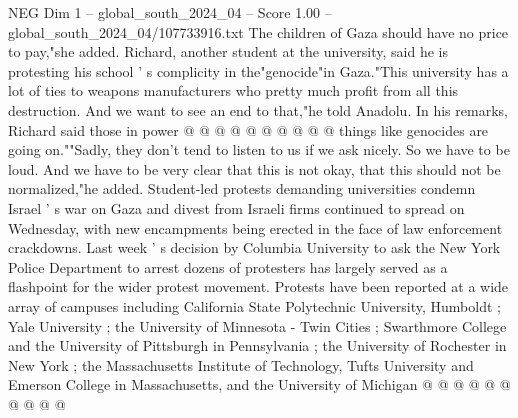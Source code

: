 \begin{textsample}{NEG Dim 1 – global\_south\_2024\_04 – Score 1.00 – global\_south\_2024\_04/107733916.txt}
The children of Gaza should have no price to pay,"she added.
Richard, another student at the university, said he is protesting his school ' s complicity in the"genocide"in Gaza."This university has a lot of ties to weapons manufacturers who pretty much profit from all this destruction.
And we want to see an end to that,"he told Anadolu.
In his remarks, Richard said those in power @ @ @ @ @ @ @ @ @ @ things like genocides are going on.""Sadly, they don't tend to listen to us if we ask nicely.
So we have to be loud.
And we have to be very clear that this is not okay, that this should not be normalized,"he added.
Student-led protests demanding universities condemn Israel ' s war on Gaza and divest from Israeli firms continued to spread on Wednesday, with new encampments being erected in the face of law enforcement crackdowns.
Last week ' s decision by Columbia University to ask the New York Police Department to arrest dozens of protesters has largely served as a flashpoint for the wider protest movement.
Protests have been reported at a wide array of campuses including California State Polytechnic University, Humboldt ; Yale University ; the University of Minnesota - Twin Cities ; Swarthmore College and the University of Pittsburgh in Pennsylvania ; the University of Rochester in New York ; the Massachusetts Institute of Technology, Tufts University and Emerson College in Massachusetts, and the University of Michigan @ @ @ @ @ @ @ @ @ @

\end{textsample}
